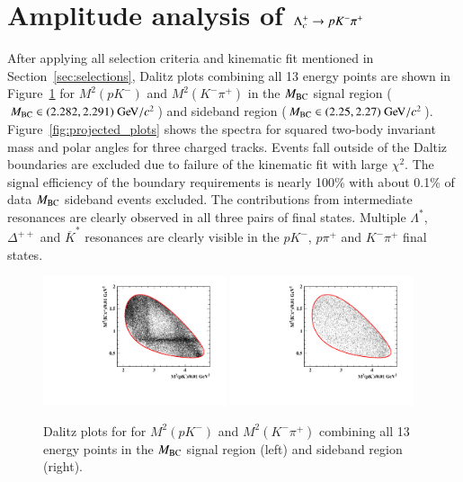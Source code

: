 \clearpage
\section{Amplitude analysis of $\Lambda_{c}^{+} \rightarrow p K^- \pi^+$}
\label{sec:pwa}

After applying all selection criteria and kinematic fit mentioned in Section~\ref{sec:selections}, Dalitz plots combining all 13 energy points are shown in Figure~\ref{fig:daltiz_plots} for $M^2(pK^-)$ and $M^2(K^-\pi^+)$ in the $M_{\rm{BC}}$ signal region ($\mbc \in (2.282, 2.291)\gev/c^2$) and sideband region ($\mbc \in (2.25, 2.27)\gev/c^2$). Figure~\ref{fig:projected_plots} shows the spectra for squared two-body invariant mass and polar angles for three charged tracks. Events fall outside of the Daltiz boundaries are excluded due to failure of the kinematic fit with large $\chi^2$. The signal efficiency of the boundary requirements is nearly 100\% with about 0.1\% of data $M_{\rm{BC}}$ sideband events excluded. The contributions from intermediate resonances are clearly observed in all three pairs of final states. Multiple $\Lambda^*$, $\Delta^{++}$ and $\overline{K}^*$ resonances are clearly visible in the $pK^-$, $p\pi^+$ and $K^-\pi^+$ final states. 

\begin{figure}[h]\centering
    \includegraphics[width=0.48\textwidth]{figure/dalitz/dalitz_Signal_total.pdf}
    \includegraphics[width=0.48\textwidth]{figure/dalitz/dalitz_Sideband_total.pdf}
    \caption{Dalitz plots for for $M^2(pK^-)$ and $M^2(K^-\pi^+)$ combining all 13 energy points in the $M_{\rm{BC}}$ signal region (left) and sideband region (right).}
\label{fig:daltiz_plots}
\end{figure}

